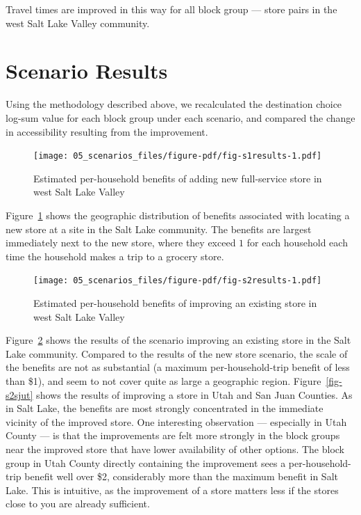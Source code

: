\documentclass[
  letterpaper,
  DIV=11,
  numbers=noendperiod]{scrreport}
\begin{document}
Travel times are improved in this way for all block group --- store
pairs in the west Salt Lake Valley community.

\hypertarget{scenario-results}{%
\section{Scenario Results}\label{scenario-results}}

Using the methodology described above, we recalculated the destination
choice log-sum value for each block group under each scenario, and
compared the change in accessibility resulting from the improvement.

\begin{figure}[t]

{\centering \texttt{[image: 05\_scenarios\_files/figure-pdf/fig-s1results-1.pdf]}

}

\caption{\label{fig-s1results}Estimated per-household benefits of adding
new full-service store in west Salt Lake Valley}

\end{figure}

Figure~\ref{fig-s1results} shows the geographic distribution of benefits
associated with locating a new store at a site in the Salt Lake
community. The benefits are largest immediately next to the new store,
where they exceed \(1\) for each household each time the household makes
a trip to a grocery store.

\begin{figure}[t]

{\centering \texttt{[image: 05\_scenarios\_files/figure-pdf/fig-s2results-1.pdf]}

}

\caption{\label{fig-s2results}Estimated per-household benefits of
improving an existing store in west Salt Lake Valley}

\end{figure}

Figure~\ref{fig-s2results} shows the results of the scenario improving
an existing store in the Salt Lake community. Compared to the results of
the new store scenario, the scale of the benefits are not as substantial
(a maximum per-household-trip benefit of less than \$1), and seem to not
cover quite as large a geographic region. Figure~\ref{fig-s2sjut} shows
the results of improving a store in Utah and San Juan Counties. As in
Salt Lake, the benefits are most strongly concentrated in the immediate
vicinity of the improved store. One interesting observation ---
especially in Utah County --- is that the improvements are felt more
strongly in the block groups near the improved store that have lower
availability of other options. The block group in Utah County directly
containing the improvement sees a per-household-trip benefit well over
\$2, considerably more than the maximum benefit in Salt Lake. This is
intuitive, as the improvement of a store matters less if the stores
close to you are already sufficient.
\end{document}
